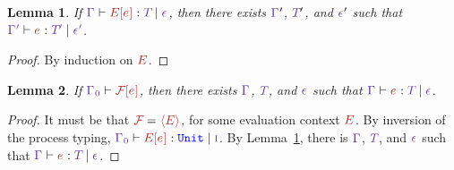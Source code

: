 \documentclass{article}
\newtheorem{lemma}{Lemma}
\begin{document}
\begin{lemma}
  \label{lemma:inversion-evaluation-context}
  If $\HasType{\Ctx}{\EC[\E]}{\T}{\Eff}$, then there exists $\Ctx'$,
  $\T'$, and $\Eff'$ such that $\HasType{\Ctx'}{\E}{\T'}{\Eff'}$.
\end{lemma}
\begin{proof}
  By induction on $\EC$.
\end{proof}

\begin{lemma}
  \label{lemma:inversion-process-evaluation-context}
  If $\ProcHasType{\Ctx_0} {\FCapp{\E}}$, then there exists $\Ctx$,
  $\T$, and $\Eff$ such that $\HasType{\Ctx}{\E}{\T}{\Eff}$.
\end{lemma}
\begin{proof}
  It must be that $\FC = \PExp \EC$, for some evaluation context $\EC$.
  By inversion of the process typing,
  $\HasType{\Ctx_0}{\EC[\E]}{\TBUnit}{\EffImpure}$.
  By Lemma~\ref{lemma:inversion-evaluation-context}, there is  $\Ctx$,
  $\T$, and $\Eff$ such that $\HasType{\Ctx}{\E}{\T}{\Eff}$.
\end{proof}
\end{document}
